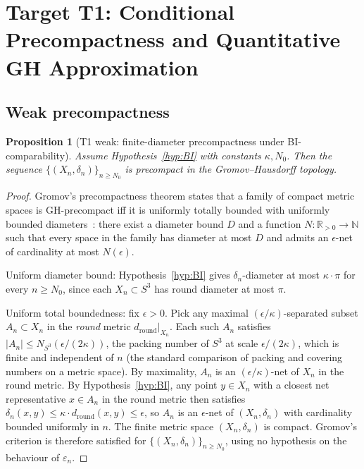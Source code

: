 \documentclass[12pt]{article}
\newtheorem{proposition}[theorem]{Proposition}
\theoremstyle{definition}
\theoremstyle{remark}
\begin{document}
\section{Target T1: Conditional Precompactness and Quantitative GH Approximation}\label{sec:T1}

\subsection{Weak precompactness}

\begin{proposition}[T1 weak: finite-diameter precompactness under BI-comparability]\label{prop:T1-weak}
Assume Hypothesis~\ref{hyp:BI} with constants $\kappa, N_0$. Then the sequence $\{(X_n, \delta_n)\}_{n \geq N_0}$ is precompact in the Gromov--Hausdorff topology.
\end{proposition}

\begin{proof}
Gromov's precompactness theorem states that a family of compact metric spaces is GH-precompact iff it is uniformly totally bounded with uniformly bounded diameters~\citep{BBI2001}: there exist a diameter bound $D$ and a function $N : \mathbb{R}_{> 0} \to \mathbb{N}$ such that every space in the family has diameter at most $D$ and admits an $\epsilon$-net of cardinality at most $N(\epsilon)$.

Uniform diameter bound: Hypothesis~\ref{hyp:BI} gives $\delta_n$-diameter at most $\kappa \cdot \pi$ for every $n \geq N_0$, since each $X_n \subset S^3$ has round diameter at most $\pi$.

Uniform total boundedness: fix $\epsilon > 0$. Pick any maximal $(\epsilon/\kappa)$-separated subset $A_n \subset X_n$ in the \emph{round} metric $d_{\mathrm{round}}|_{X_n}$. Each such $A_n$ satisfies $|A_n| \leq N_{S^3}(\epsilon/(2\kappa))$, the packing number of $S^3$ at scale $\epsilon/(2\kappa)$, which is finite and independent of $n$ (the standard comparison of packing and covering numbers on a metric space). By maximality, $A_n$ is an $(\epsilon/\kappa)$-net of $X_n$ in the round metric. By Hypothesis~\ref{hyp:BI}, any point $y \in X_n$ with a closest net representative $x \in A_n$ in the round metric then satisfies $\delta_n(x,y) \leq \kappa \cdot d_{\mathrm{round}}(x,y) \leq \epsilon$, so $A_n$ is an $\epsilon$-net of $(X_n, \delta_n)$ with cardinality bounded uniformly in $n$. The finite metric space $(X_n, \delta_n)$ is compact. Gromov's criterion is therefore satisfied for $\{(X_n, \delta_n)\}_{n \geq N_0}$, using no hypothesis on the behaviour of $\varepsilon_n$.
\end{proof}
\end{document}
